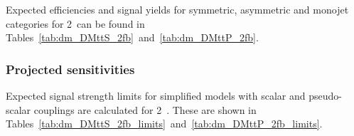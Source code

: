 Expected efficiencies and signal yields for symmetric, asymmetric and monojet categories for 2~\ifb can be found in
Tables~\ref{tab:dm_DMttS_2fb}~and~\ref{tab:dm_DMttP_2fb}.

\clearpage


\clearpage


\subsubsection{Projected sensitivities}

Expected signal strength limits for simplified \DMtt models with scalar and pseudo-scalar couplings are
calculated for 2~\ifb. These are shown in Tables~\ref{tab:dm_DMttS_2fb_limits}~and~\ref{tab:dm_DMttP_2fb_limits}. 








